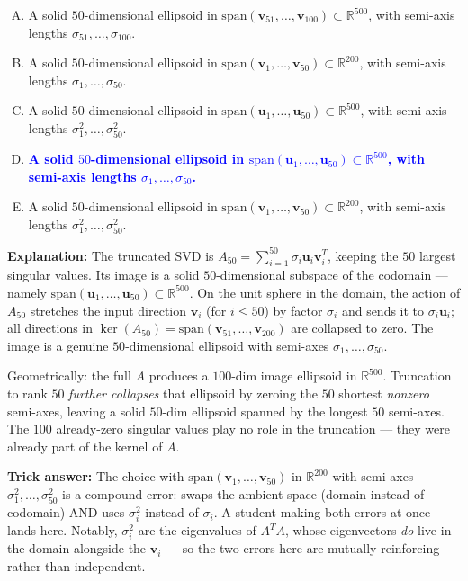 \documentclass[12pt]{amsart}
\begin{document}
\begin{enumerate}[(A)]
\item A solid $50$-dimensional ellipsoid in $\mathrm{span}(\mathbf{v}_{51}, \ldots, \mathbf{v}_{100}) \subset \mathbb{R}^{500}$, with semi-axis lengths $\sigma_{51}, \ldots, \sigma_{100}$.
\item A solid $50$-dimensional ellipsoid in $\mathrm{span}(\mathbf{v}_1, \ldots, \mathbf{v}_{50}) \subset \mathbb{R}^{200}$, with semi-axis lengths $\sigma_1, \ldots, \sigma_{50}$.
\item A solid $50$-dimensional ellipsoid in $\mathrm{span}(\mathbf{u}_1, \ldots, \mathbf{u}_{50}) \subset \mathbb{R}^{500}$, with semi-axis lengths $\sigma_1^2, \ldots, \sigma_{50}^2$.
\item \textcolor{blue}{\textbf{A solid $50$-dimensional ellipsoid in $\mathrm{span}(\mathbf{u}_1, \ldots, \mathbf{u}_{50}) \subset \mathbb{R}^{500}$, with semi-axis lengths $\sigma_1, \ldots, \sigma_{50}$.}}
\item A solid $50$-dimensional ellipsoid in $\mathrm{span}(\mathbf{v}_1, \ldots, \mathbf{v}_{50}) \subset \mathbb{R}^{200}$, with semi-axis lengths $\sigma_1^2, \ldots, \sigma_{50}^2$.
\end{enumerate}

\textbf{Explanation:}
The truncated SVD is
$A_{50} = \sum_{i=1}^{50} \sigma_i \mathbf{u}_i \mathbf{v}_i^T$, keeping
the $50$ largest singular values. Its image is a solid $50$-dimensional
subspace of the codomain --- namely $\mathrm{span}(\mathbf{u}_1, \ldots, \mathbf{u}_{50}) \subset \mathbb{R}^{500}$.
On the unit sphere in the domain, the action of $A_{50}$ stretches the
input direction $\mathbf{v}_i$ (for $i \leq 50$) by factor $\sigma_i$ and
sends it to $\sigma_i \mathbf{u}_i$; all directions in
$\ker(A_{50}) = \mathrm{span}(\mathbf{v}_{51}, \ldots, \mathbf{v}_{200})$
are collapsed to zero. The image is a genuine $50$-dimensional ellipsoid
with semi-axes $\sigma_1, \ldots, \sigma_{50}$.

Geometrically: the full $A$ produces a $100$-dim image ellipsoid in
$\mathbb{R}^{500}$. Truncation to rank $50$ \emph{further collapses} that
ellipsoid by zeroing the $50$ shortest \emph{nonzero} semi-axes, leaving
a solid $50$-dim ellipsoid spanned by the longest $50$ semi-axes. The $100$
already-zero singular values play no role in the truncation --- they were
already part of the kernel of $A$.

\textbf{Trick answer:}
The choice with $\mathrm{span}(\mathbf{v}_1, \ldots, \mathbf{v}_{50})$ in
$\mathbb{R}^{200}$ with semi-axes $\sigma_1^2, \ldots, \sigma_{50}^2$ is a
compound error: swaps the ambient space (domain instead of codomain) AND
uses $\sigma_i^2$ instead of $\sigma_i$. A student making both errors at
once lands here. Notably, $\sigma_i^2$ are the eigenvalues of $A^TA$, whose
eigenvectors \emph{do} live in the domain alongside the $\mathbf{v}_i$ ---
so the two errors here are mutually reinforcing rather than independent.
\end{document}
